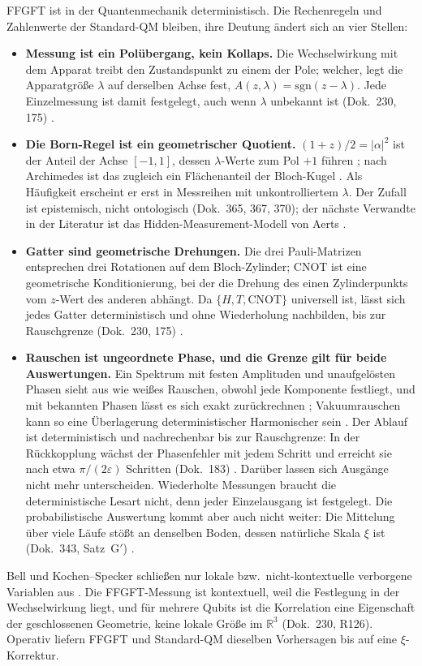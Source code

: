 FFGFT ist in der Quantenmechanik deterministisch. Die Rechenregeln und Zahlenwerte der
Standard-QM bleiben, ihre Deutung ändert sich an vier Stellen:
\begin{itemize}[leftmargin=*,itemsep=2pt]
\item \textbf{Messung ist ein Polübergang, kein Kollaps.} Die Wechselwirkung mit dem Apparat
  treibt den Zustandspunkt zu einem der Pole; welcher, legt die Apparatgröße $\lambda$ auf
  derselben Achse fest, $A(z,\lambda)=\mathrm{sgn}(z-\lambda)$. Jede Einzelmessung ist damit
  festgelegt, auch wenn $\lambda$ unbekannt ist (Dok.~230, 175) \KM.
\item \textbf{Die Born-Regel ist ein geometrischer Quotient.} $(1+z)/2=|\alpha|^2$ ist der Anteil
  der Achse $[-1,1]$, dessen $\lambda$-Werte zum Pol $+1$ führen \KM; nach Archimedes ist das
  zugleich ein Flächenanteil der Bloch-Kugel \BM. Als Häufigkeit erscheint er erst in
  Messreihen mit unkontrolliertem $\lambda$. Der Zufall ist epistemisch, nicht ontologisch
  (Dok.~365, 367, 370); der nächste Verwandte in der Literatur ist das Hidden-Measurement-Modell
  von Aerts \QM.
\item \textbf{Gatter sind geometrische Drehungen.} Die drei Pauli-Matrizen entsprechen drei
  Rotationen auf dem Bloch-Zylinder; CNOT ist eine geometrische Konditionierung, bei der die
  Drehung des einen Zylinderpunkts vom $z$-Wert des anderen abhängt. Da $\{H,T,\mathrm{CNOT}\}$
  universell ist, lässt sich jedes Gatter deterministisch und ohne Wiederholung nachbilden, bis
  zur Rauschgrenze (Dok.~230, 175) \KM.
\item \textbf{Rauschen ist ungeordnete Phase, und die Grenze gilt für beide Auswertungen.} Ein
  Spektrum mit festen Amplituden und unaufgelösten Phasen sieht aus wie weißes Rauschen, obwohl
  jede Komponente festliegt, und mit bekannten Phasen lässt es sich exakt zurückrechnen \KM;
  Vakuumrauschen kann so eine Überlagerung deterministischer
  Harmonischer sein \SM. Der Ablauf ist deterministisch und nachrechenbar bis zur Rauschgrenze:
  In der Rückkopplung wächst der Phasenfehler mit jedem Schritt und erreicht sie nach etwa
  $\pi/(2\varepsilon)$ Schritten (Dok.~183) \SM. Darüber lassen sich Ausgänge nicht mehr
  unterscheiden. Wiederholte Messungen braucht die deterministische Lesart nicht, denn jeder
  Einzelausgang ist festgelegt. Die probabilistische Auswertung kommt aber auch nicht weiter:
  Die Mittelung über viele Läufe stößt an denselben Boden, dessen natürliche Skala $\xi$ ist
  (Dok.~343, Satz~G$'$) \SM.
\end{itemize}
Bell und Kochen--Specker schließen nur lokale bzw.\ nicht-kontextuelle verborgene Variablen aus \QM.
Die FFGFT-Messung ist kontextuell, weil die Festlegung in der Wechselwirkung liegt, und für
mehrere Qubits ist die Korrelation eine Eigenschaft der geschlossenen Geometrie, keine lokale
Größe im $\mathbb{R}^3$ (Dok.~230, R126). Operativ liefern FFGFT und Standard-QM dieselben
Vorhersagen bis auf eine $\xi$-Korrektur.

